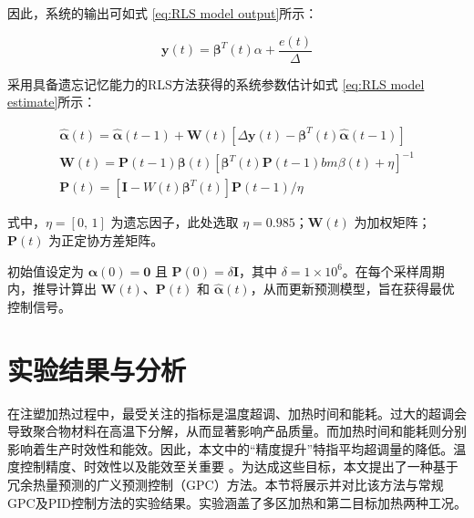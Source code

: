 因此，系统的输出可如式 \ref{eq:RLS model output}所示：\par
\begin{equation}
    \boldsymbol{y}(t) = \boldsymbol{\beta}^T(t) \alpha + \frac{e(t)}{\Delta}
    \label{eq:RLS model output}
\end{equation}\par
采用具备遗忘记忆能力的RLS方法获得的系统参数估计如式 \ref{eq:RLS model estimate}所示：\par

\begin{equation}
    \begin{array}{l}
        \hat{\boldsymbol{\alpha}}(t) = \hat{\boldsymbol{\alpha}}(t-1) + \boldsymbol{W}(t)\left[\Delta \boldsymbol{y}(t)-\boldsymbol{\beta}^{T}(t) \hat{\boldsymbol{\alpha}}(t-1)\right] \\
        \boldsymbol{W}(t) = \boldsymbol{P}(t-1) \boldsymbol{\beta}(t) \left[\boldsymbol{\beta}^{T}(t) \boldsymbol{P}(t-1) bm{\beta}(t)+ \eta\right]^{-1} \\
        \boldsymbol{P}(t) = \left[\boldsymbol{I} - W(t) \boldsymbol{\beta}^{T}(t)\right] \boldsymbol{P}(t-1) / \eta
    \end{array}
    \label{eq:RLS model estimate}
\end{equation}

式中，$\eta = [0,\,1]$ 为遗忘因子，此处选取 $\eta = 0.985$；$\boldsymbol{W}(t)$ 为加权矩阵；$\boldsymbol{P}(t)$ 为正定协方差矩阵。\par

初始值设定为 $\boldsymbol{\alpha}(0) = \boldsymbol{0}$ 且 $\boldsymbol{P}(0) = \delta \boldsymbol{I}$，其中 $\delta = 1\times10^6$。在每个采样周期内，推导计算出 $\boldsymbol{W}(t)$、$\boldsymbol{P}(t)$ 和 $\hat{\boldsymbol{\alpha}}(t)$，从而更新预测模型，旨在获得最优控制信号。\par

\section{实验结果与分析}

在注塑加热过程中，最受关注的指标是温度超调、加热时间和能耗。过大的超调会导致聚合物材料在高温下分解，从而显著影响产品质量。而加热时间和能耗则分别影响着生产时效性和能效。因此，本文中的“精度提升”特指平均超调量的降低。温度控制精度、时效性以及能效至关重要 \cite{Peng_2012_model}。为达成这些目标，本文提出了一种基于冗余热量预测的广义预测控制（GPC）方法。本节将展示并对比该方法与常规GPC及PID控制方法的实验结果。实验涵盖了多区加热和第二目标加热两种工况。

